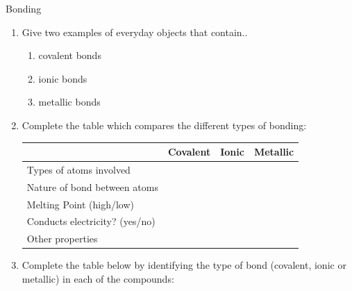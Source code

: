             \begin{exercises}{Bonding
        }
            \nopagebreak \noindent
        \label{m38694*id143111}\begin{enumerate}[noitemsep, label=\textbf{\arabic*}. ] 
           \label{m38694*uid86}\item Give two examples of everyday objects that contain..
\label{m38694*id143127}\begin{enumerate}[noitemsep, label=\textbf{\alph*}. ] 
            \label{m38694*uid87}\item covalent bonds
\label{m38694*uid88}\item ionic bonds
\label{m38694*uid89}\item metallic bonds
\end{enumerate}
               \label{m38694*uid90}\item Complete the table which compares the different types of bonding:
          \begin{table}[H]
        \begin{center}
      \label{m38694*id143180}
    \noindent
      \begin{tabular}{|l|l|l|l|}\hline
         &
        \textbf{Covalent} &
        \textbf{Ionic} &
        \textbf{Metallic} \\ \hline
        Types of atoms involved &
         &
         &
        \\ \hline
        Nature of bond between atoms &
         &
         &
       \\ \hline
        Melting Point (high/low) &
         &
         &
       \\ \hline
        Conducts electricity? (yes/no) &
         &
         &
      \\ \hline
        Other properties &
         &
         &
       \\ \hline
    \end{tabular}
      \end{center}
\end{table}
    \par
          \label{m38694*uid91}\item Complete the table below by identifying the type of bond (covalent, ionic or metallic) in each of the compounds:

\end{enumerate}
\end{exercises}
